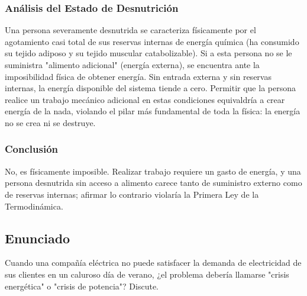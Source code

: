 \documentclass[12pt,a4paper]{article}
\begin{document}
\subsubsection*{Análisis del Estado de Desnutrición}
Una persona severamente desnutrida se caracteriza físicamente por el agotamiento casi total de sus reservas internas de energía química (ha consumido su tejido adiposo y su tejido muscular catabolizable). Si a esta persona no se le suministra "alimento adicional" (energía externa), se encuentra ante la imposibilidad física de obtener energía. Sin entrada externa y sin reservas internas, la energía disponible del sistema tiende a cero. Permitir que la persona realice un trabajo mecánico adicional en estas condiciones equivaldría a crear energía de la nada, violando el pilar más fundamental de toda la física: la energía no se crea ni se destruye.

\subsubsection*{Conclusión}
No, es físicamente imposible. Realizar trabajo requiere un gasto de energía, y una persona desnutrida sin acceso a alimento carece tanto de suministro externo como de reservas internas; afirmar lo contrario violaría la Primera Ley de la Termodinámica.

\newpage
\subsection*{Enunciado}
Cuando una compañía eléctrica no puede satisfacer la demanda de electricidad de sus clientes en un caluroso día de verano, ¿el problema debería llamarse "crisis energética" o "crisis de potencia"? Discute.

\begin{center}
\end{center}
\end{document}
